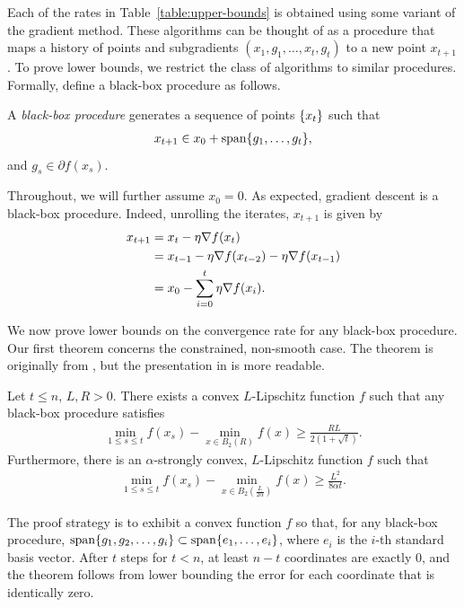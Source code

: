 Each of the rates in Table~\eqref{table:upper-bounds} is obtained using some variant of the
gradient method. These algorithms can be thought of as a procedure that
maps a history of points and subgradients $(x_1, g_1, \dots, x_t, g_t)$ to a 
new point $x_{t+1}$. To prove lower bounds, we restrict the class of algorithms 
to similar procedures. Formally, define a black-box procedure as follows.

\begin{definition}
A \textit{black-box procedure} generates a sequence of points $\{x_t\}$
such that
\begin{align*}
    x_{t+1} \in x_0 + \mathop{\rm span}\{g_1, \dots, g_t\},
\end{align*}
and $g_s \in \partial f (x_s)$.
\end{definition}
Throughout, we will further assume $x_0 = 0$. As expected, gradient descent is a
black-box procedure. Indeed, unrolling the iterates, $x_{t+1}$ is given by
\begin{align*}
    x_{t+1} 
    &= x_t - \eta \nabla f(x_t) \\
    &= x_{t-1} - \eta \nabla f(x_{t-2}) - \eta \nabla f(x_{t-1}) \\
    &= x_0 - \sum_{i=0}^t \eta \nabla f (x_i).
\end{align*}

We now prove lower bounds on the convergence rate for any black-box procedure.
Our first theorem concerns the constrained, non-smooth case.
The theorem is originally from \cite{nesterov83}, but the presentation in
\cite{nesterov04} is more readable. 
~
\begin{theorem}\label{theorem:lb-non-smooth}
Let $t \leq n$, $L, R  > 0$. There exists a convex $L$-Lipschitz function $f$
such that any black-box procedure satisfies
\begin{align}
    \min_{1 \leq s \leq t} f(x_s) - \min_{x \in B_2(R)} f(x)
    \geq \frac{RL}{2(1+\sqrt{t})}.
\end{align}
Furthermore, there is an $\alpha$-strongly convex, $L$-Lipschitz function $f$
such that
\begin{align}
    \min_{1 \leq s \leq t} f(x_s) - \min_{x \in B_2(\frac{L}{2\alpha})} f(x)
    \geq \frac{L^2}{8\alpha t}.
\end{align}
\end{theorem}
The proof strategy is to exhibit a convex function $f$ so that, for any black-box procedure,
$\mathop{\rm span}\{g_1, g_2, \dots, g_i\} \subset \mathop{\rm span}\{e_1, \dots, e_i\}$, where
$e_i$ is the $i$-th standard basis vector. After $t$ steps for $t < n$, at least
$n-t$ coordinates are exactly 0, and the theorem follows from lower bounding the
error for each coordinate that is identically zero. 

